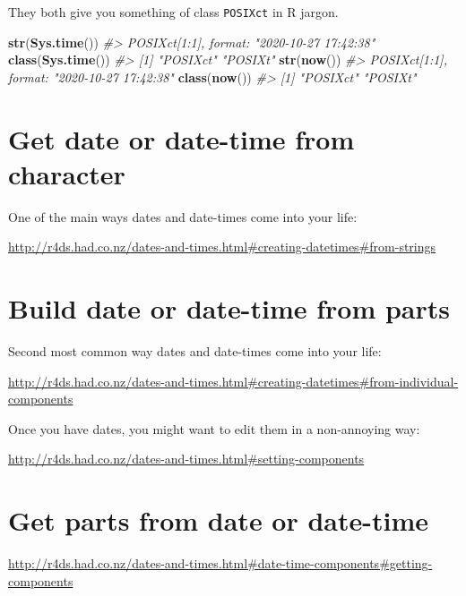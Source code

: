 \documentclass[
]{book}
\newenvironment{Shaded}{\begin{snugshade}}{\end{snugshade}}
\newcommand{\CommentTok}[1]{\textcolor[rgb]{0.56,0.35,0.01}{\textit{#1}}}
\newcommand{\KeywordTok}[1]{\textcolor[rgb]{0.13,0.29,0.53}{\textbf{#1}}}
\newcommand{\NormalTok}[1]{#1}
\begin{document}
They both give you something of class \texttt{POSIXct} in R jargon.

\begin{Shaded}
\begin{Highlighting}[]
\KeywordTok{str}\NormalTok{(}\KeywordTok{Sys.time}\NormalTok{())}
\CommentTok{#>  POSIXct[1:1], format: "2020-10-27 17:42:38"}
\KeywordTok{class}\NormalTok{(}\KeywordTok{Sys.time}\NormalTok{())}
\CommentTok{#> [1] "POSIXct" "POSIXt"}
\KeywordTok{str}\NormalTok{(}\KeywordTok{now}\NormalTok{())}
\CommentTok{#>  POSIXct[1:1], format: "2020-10-27 17:42:38"}
\KeywordTok{class}\NormalTok{(}\KeywordTok{now}\NormalTok{())}
\CommentTok{#> [1] "POSIXct" "POSIXt"}
\end{Highlighting}
\end{Shaded}

\hypertarget{get-date-or-date-time-from-character}{%
\section{Get date or date-time from character}\label{get-date-or-date-time-from-character}}

One of the main ways dates and date-times come into your life:

\url{http://r4ds.had.co.nz/dates-and-times.html\#creating-datetimes\#from-strings}

\hypertarget{build-date-or-date-time-from-parts}{%
\section{Build date or date-time from parts}\label{build-date-or-date-time-from-parts}}

Second most common way dates and date-times come into your life:

\url{http://r4ds.had.co.nz/dates-and-times.html\#creating-datetimes\#from-individual-components}

Once you have dates, you might want to edit them in a non-annoying way:

\url{http://r4ds.had.co.nz/dates-and-times.html\#setting-components}

\hypertarget{get-parts-from-date-or-date-time}{%
\section{Get parts from date or date-time}\label{get-parts-from-date-or-date-time}}

\url{http://r4ds.had.co.nz/dates-and-times.html\#date-time-components\#getting-components}
\end{document}
